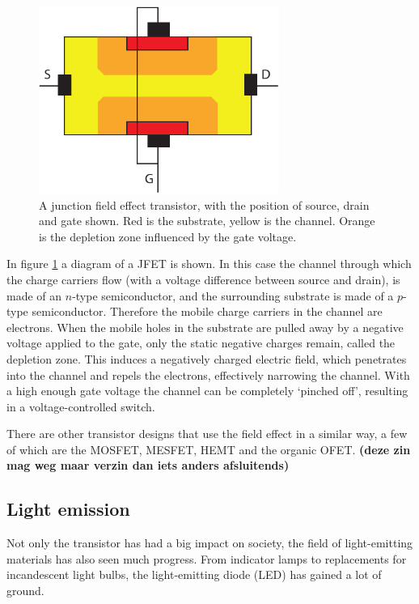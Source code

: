\begin{figure}[!ht]
 \begin{center}
  \includegraphics[width=0.7\textwidth]{jfet}
  \caption{A junction field effect transistor, with the position of source, drain and gate shown. Red is the substrate, yellow is the channel. Orange is the depletion zone influenced by the gate voltage.}
  \label{fig:JFET}
 \end{center}
\end{figure}

In figure \ref{fig:JFET} a diagram of a JFET is shown. In this case the channel through which the charge carriers flow (with a voltage difference between source and drain), is made of an $n$-type semiconductor, and the surrounding substrate is made of a $p$-type semiconductor. Therefore the mobile charge carriers in the channel are electrons. When the mobile holes in the substrate are pulled away by a negative voltage applied to the gate, only the static negative charges remain, called the depletion zone. This induces a negatively charged electric field, which penetrates into the channel and repels the electrons, effectively narrowing the channel. With a high enough gate voltage the channel can be completely `pinched off', resulting in a voltage-controlled switch.

There are other transistor designs that use the field effect in a similar way, a few of which are the MOSFET, MESFET, HEMT and the organic OFET. \textbf{(deze zin mag weg maar verzin dan iets anders afsluitends)}

\subsection{Light emission}
Not only the transistor has had a big impact on society, the field of light-emitting materials has also seen much progress. From indicator lamps to replacements for incandescent light bulbs, the light-emitting diode (LED) has gained a lot of ground.

